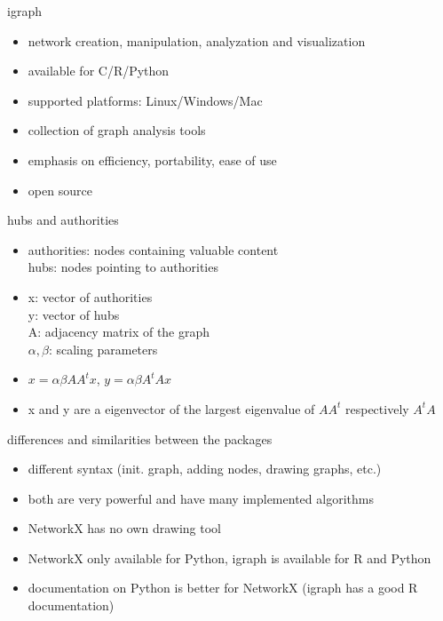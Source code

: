 \documentclass[12pt]{beamer}
\begin{document}
	\begin{frame}{igraph}
		\begin{itemize}
			\item network creation, manipulation, analyzation and visualization
			\item available for C/R/Python
			\item supported platforms: Linux/Windows/Mac 
			\item collection of graph analysis tools
			\item emphasis on efficiency, portability, ease of use
			\item open source
		\end{itemize}
	\end{frame}
	\begin{frame}{hubs and authorities}
		\begin{itemize}
			\item authorities: nodes containing valuable content\\
			hubs: nodes pointing to authorities
			\item x: vector of authorities \\
			y: vector of hubs \\
			A: adjacency matrix of the graph \\
			$\alpha,\beta$: scaling parameters
			\item $x = \alpha \beta A A^t x$, $y = \alpha \beta A^t A x$
			\item x and y are a eigenvector of the largest eigenvalue of $A A^t$ respectively $A^t A$
		\end{itemize}
	\end{frame}
	\begin{frame}{differences and similarities between the packages}
		\begin{itemize}
			\item different syntax (init. graph, adding nodes, drawing graphs, etc.)
			\item both are very powerful and have many implemented algorithms
			\item NetworkX has no own drawing tool 
			\item NetworkX only available for Python, igraph is available for R and Python
			\item documentation on Python is better for NetworkX (igraph has a good R documentation)
		\end{itemize}
	\end{frame}
\end{document}
